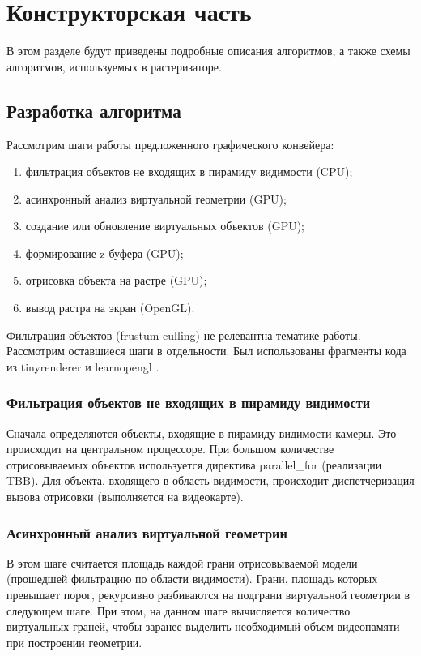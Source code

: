 \chapter{Конструкторская часть}

В этом разделе будут приведены подробные описания алгоритмов, а также схемы алгоритмов, используемых в растеризаторе.

\section{Разработка алгоритма}

Рассмотрим шаги работы предложенного графического конвейера:

\begin{enumerate}[label={\arabic*)}]
	\item фильтрация объектов не входящих в пирамиду видимости (CPU);
	\item асинхронный анализ виртуальной геометрии (GPU);
	\item создание или обновление виртуальных объектов (GPU);
	\item формирование z-буфера (GPU);
	\item отрисовка объекта на растре (GPU);
	\item вывод растра на экран (OpenGL).
\end{enumerate}

Фильтрация объектов (frustum culling) не релевантна тематике работы.
Рассмотрим оставшиеся шаги в отдельности. 
Был использованы фрагменты кода из tinyrenderer \cite{tinyrenderer} и learnopengl \cite{learnopengl}.

\subsection{Фильтрация объектов не входящих в пирамиду видимости}
Сначала определяются объекты, входящие в пирамиду видимости камеры. Это происходит на центральном процессоре. При большом количестве отрисовываемых объектов используется директива parallel\_for (реализации TBB).
Для объекта, входящего в область видимости, происходит диспетчеризация вызова отрисовки (выполняется на видеокарте).

\subsection{Асинхронный анализ виртуальной геометрии}

В этом шаге считается площадь каждой грани отрисовываемой модели (прошедшей фильтрацию по области видимости).
Грани, площадь которых превышает порог, рекурсивно разбиваются на подграни виртуальной геометрии в следующем шаге.
При этом, на данном шаге вычисляется количество виртуальных граней, чтобы заранее выделить необходимый объем видеопамяти при построении геометрии.

